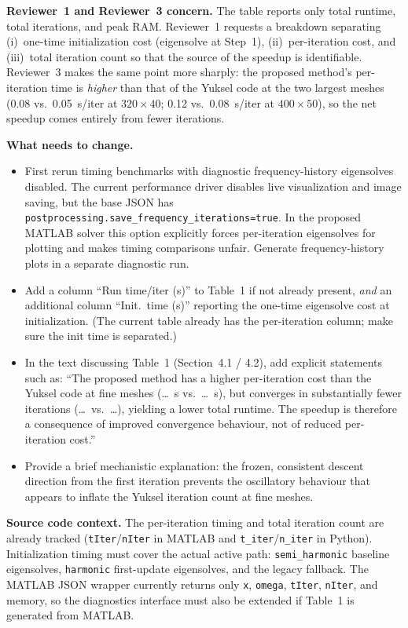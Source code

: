 \documentclass[12pt,a4paper]{article}
\begin{document}
\textbf{Reviewer~1 and Reviewer~3 concern.}  The table reports only total
runtime, total iterations, and peak RAM. Reviewer~1 requests a breakdown
separating (i)~one-time initialization cost (eigensolve at Step~1),
(ii)~per-iteration cost, and (iii)~total iteration count so that the source
of the speedup is identifiable. Reviewer~3 makes the same point more sharply:
the proposed method's per-iteration time is \emph{higher} than that of the
Yuksel code at the two largest meshes (0.08 vs.\ 0.05~s/iter at
$320{\times}40$; 0.12 vs.\ 0.08~s/iter at $400{\times}50$), so the net
speedup comes entirely from fewer iterations.

\textbf{What needs to change.}
\begin{itemize}[leftmargin=1.6em]
  \item First rerun timing benchmarks with diagnostic frequency-history
        eigensolves disabled.  The current performance driver disables live
        visualization and image saving, but the base JSON has
        \texttt{postprocessing.save\_frequency\_iterations=true}.  In the
        proposed MATLAB solver this option explicitly forces per-iteration
        eigensolves for plotting and makes timing comparisons unfair.
        Generate frequency-history plots in a separate diagnostic run.
  \item Add a column ``Run time/iter (s)'' to Table~1 if not already
        present, \emph{and} an additional column ``Init.\ time (s)''
        reporting the one-time eigensolve cost at initialization.  (The
        current table already has the per-iteration column; make sure the
        init time is separated.)
  \item In the text discussing Table~1 (Section~4.1 / 4.2), add explicit
        statements such as: ``The proposed method has a higher per-iteration
        cost than the Yuksel code at fine meshes (\ldots~s vs.\ \ldots~s),
        but converges in substantially fewer iterations (\ldots\ vs.\
        \ldots), yielding a lower total runtime. The speedup is therefore
        a consequence of improved convergence behaviour, not of reduced
        per-iteration cost.''
  \item Provide a brief mechanistic explanation: the frozen, consistent
        descent direction from the first iteration prevents the oscillatory
        behaviour that appears to inflate the Yuksel iteration count at fine
        meshes.
\end{itemize}

\textbf{Source code context.}  The per-iteration timing and total iteration
count are already tracked (\texttt{tIter}/\texttt{nIter} in MATLAB and
\texttt{t\_iter}/\texttt{n\_iter} in Python).  Initialization timing must
cover the actual active path: \texttt{semi\_harmonic} baseline eigensolves,
\texttt{harmonic} first-update eigensolves, and the legacy fallback.  The
MATLAB JSON wrapper currently returns only \texttt{x}, \texttt{omega},
\texttt{tIter}, \texttt{nIter}, and memory, so the diagnostics interface must
also be extended if Table~1 is generated from MATLAB.
\end{document}
